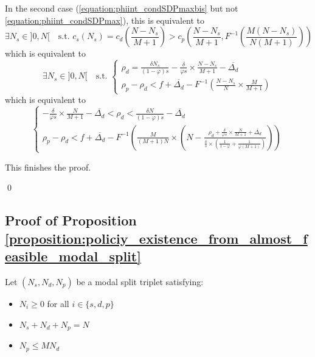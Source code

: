 \documentclass[english, a4paper]{article}
\theoremstyle{plain}
\theoremstyle{definition}
\theoremstyle{remark}
\begin{document}
In the second case (\ref{equation:phiint_condSDPmaxbis} but not \ref{equation:phiint_condSDPmax}), this is equivalent to 
\begin{equation*}
    \exists N_s \in ]0, N[ \quad \text{s.t. } c_s(N_s) =  c_d \left( \frac{N-N_s}{M+1} \right) > c_p \left( \frac{N-N_s}{M+1}, F^{-1} \left( \frac{M(N-N_s)}{N(M+1)} \right) \right)
\end{equation*}which is equivalent to
\begin{equation*}
    \exists N_s \in ]0, N[ \quad \text{s.t. } \left\{
    \begin{array}{l}
        \rho _d = \frac{\delta N_s}{(1- \varphi ) s} - \frac{\delta}{\varphi s}\times \frac{N-N_s}{M+1} - \overline{\Delta _d}\\
        \rho _p - \rho _d < f + \overline{\Delta _d} - F^{-1} \left( \frac{N-N_s}{N}\times \frac{M}{M+1} \right)
    \end{array}
    \right.
\end{equation*}which is equivalent to
\begin{equation*}
    \left\{
    \begin{array}{l}
        -\frac{\delta}{\varphi s}\times \frac{N}{M+1} - \overline{\Delta _d} < \rho _d < \frac{\delta N}{(1-\varphi ) s} - \overline{\Delta _d}\\
        \rho _p - \rho _d < f + \overline{\Delta _d} - F^{-1}\left( \frac{M}{(M+1)N} \times \left( N - \frac{\rho_d + \frac{\delta}{\varphi s}\times \frac{N}{M+1} + \overline{\Delta _d}}{\frac{\delta}{s}\times \left( \frac{1}{1-\varphi} + \frac{1}{\varphi (M+1)} \right)} \right)\right)
    \end{array}
    \right.
\end{equation*}
    
This finishes the proof.

\qed

\subsection{Proof of Proposition \ref{proposition:policiy_existence_from_almost_feasible_modal_split}}
\label{proof:policiy_existence_from_almost_feasible_modal_split}

Let $(N_s, N_d, N_p)$ be a modal split triplet satisfying:
\begin{itemize}
    \item $N_i \geq 0$ for all $i \in \{s, d, p\}$
    \item $N_s + N_d + N_p = N$
    \item $N_p \leq MN_d$
\end{itemize}
\end{document}
